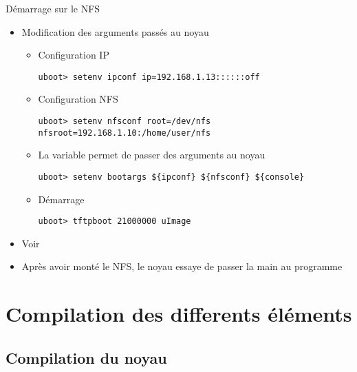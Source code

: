 \begin{frame}[fragile=singleslide]{Démarrage sur le NFS}
  \begin{itemize}
  \item Modification des arguments passés au noyau
    \begin{itemize}
    \item Configuration IP
      \begin{lstlisting}
uboot> setenv ipconf ip=192.168.1.13::::::off
      \end{lstlisting}
    \item Configuration NFS
      \begin{lstlisting}
uboot> setenv nfsconf root=/dev/nfs nfsroot=192.168.1.10:/home/user/nfs
      \end{lstlisting}
    \item La variable  permet de passer des arguments au noyau
      \begin{lstlisting}
uboot> setenv bootargs ${ipconf} ${nfsconf} ${console}
      \end{lstlisting}
    \item Démarrage
      \begin{lstlisting}
uboot> tftpboot 21000000 uImage
      \end{lstlisting}
    \end{itemize}
  \item Voir 
  \item Après avoir monté le NFS, le noyau essaye de passer la main au
    programme 
  \end{itemize}
\end{frame}

\section{Compilation des differents éléments}

\subsection{Compilation du noyau}

